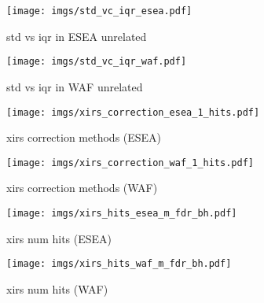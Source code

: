 \documentclass[11pt]{article}
\begin{document}
\begin{figure}
	\center
	\texttt{[image: imgs/std\_vc\_iqr\_esea.pdf]}
	\caption{std vs iqr in ESEA unrelated}
	\label{fig:std_vs_iqr_easa}
\end{figure}

\begin{figure}
	\center
	\texttt{[image: imgs/std\_vc\_iqr\_waf.pdf]}
	\caption{std vs iqr in WAF unrelated}
	\label{fig:std_vs_iqr_waf}
\end{figure}

\begin{figure}
	\center
	\texttt{[image: imgs/xirs\_correction\_esea\_1\_hits.pdf]}
	\caption{xirs correction methods (ESEA)}
	\label{fig:xirs_correction_esea_1_hits}
\end{figure}

\begin{figure}
	\center
	\texttt{[image: imgs/xirs\_correction\_waf\_1\_hits.pdf]}
	\caption{xirs correction methods (WAF)}
	\label{fig:xirs_correction_waf_1_hits}
\end{figure}

\begin{figure}
	\center
	\texttt{[image: imgs/xirs\_hits\_esea\_m\_fdr\_bh.pdf]}
	\caption{xirs num hits (ESEA)}
	\label{fig:xirs_hits_esea_m_fdr_bh}
\end{figure}

\begin{figure}
	\center
	\texttt{[image: imgs/xirs\_hits\_waf\_m\_fdr\_bh.pdf]}
	\caption{xirs num hits (WAF)}
	\label{fig:xirs_hits_waf_m_fdr_bh}
\end{figure}
\end{document}
